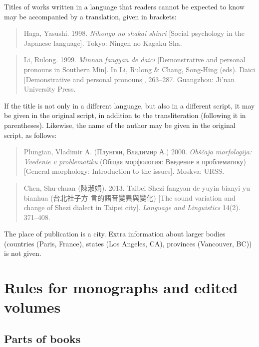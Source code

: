 \documentclass[a4paper]{article}
\newenvironment{gsrexq}{\begin{quote}\color{blue}}{\end{quote}}
\begin{document}
Titles of works
written in a language that readers cannot be expected to know may be
accompanied by a translation, given in brackets: 


\begin{gsrexq}
Haga, Yasushi. 1998.
\textit{Nihongo no shakai shinri} [Social psychology in the Japanese
language]. Tokyo: Ningen no Kagaku Sha.
\end{gsrexq}


\begin{gsrexq}
Li, Rulong. 1999. \textit{Minnan fangyan de daici} 
[Demonstrative and personal pronouns in Southern Min]. 
In Li, Rulong \& Chang, Song-Hing (eds). 
Daici [Demonstrative and personal pronouns], 263--287. 
Guangzhou: Ji'nan University Press.
\end{gsrexq}


If the title is not only in a different language, but also in a
different script, it may be given in the original script, in addition to
the transliteration (following it in parentheses). Likewise, the name of
the author may be given in the original script, as follows:


\begin{gsrexq}
Plungian, Vladimir A. (Плунгян, Владимир А.) 2000. 
\textit{Obščaja morfologija: Vvedenie v problematiku}
(Общая морфология: Введение в проблематику) 
[General morphology: Introduction to the issues]. 
Moskva: URSS. 
\end{gsrexq}


\begin{gsrexq}
Chen, Shu-chuan (陳淑娟). 2013. Taibei Shezi fangyan de yuyin bianyi yu bianhua
(台北社子方 言的語音變異與變化) 
[The sound variation and change of Shezi dialect in Taipei city]. 
\textit{Language and Linguistics} 14(2). 371--408.
\end{gsrexq}


The place of publication is a city. Extra information about larger
bodies (countries (Paris, France), states (Los Angeles, CA), provinces
(Vancouver, BC)) is not given.

\section{Rules for monographs and edited volumes}\label{{sec:monoev}}

\subsection{Parts of books}\label{sec:parts-of-books}
\end{document}
